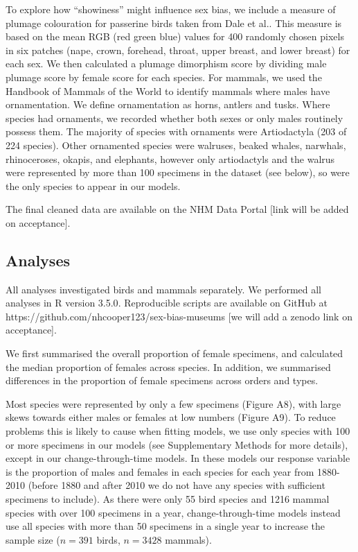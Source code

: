 \documentclass[a4paper, 12pt]{article}
\begin{document}
To explore how ``showiness'' might influence sex bias, we include a measure of plumage colouration for passerine birds taken from Dale et al.\cite{dale2015data,dale2015effects}. 
This measure is based on the mean RGB (red green blue) values for 400 randomly chosen pixels in six patches (nape, crown, forehead, throat, upper breast, and lower breast) for each sex. 
We then calculated a plumage dimorphism score by dividing male plumage score by female score for each species. 
For mammals, we used the Handbook of Mammals of the World to identify mammals where males have ornamentation. We define ornamentation as horns, antlers and tusks. 
Where species had ornaments, we recorded whether both sexes or only males routinely possess them. The majority of species with ornaments were Artiodactyla (203 of 224 species). 
Other ornamented species were walruses, beaked whales, narwhals, rhinoceroses, okapis, and elephants, however only artiodactyls and the walrus were represented by more than 100 specimens in the dataset (see below), so were the only species to appear in our models.

The final cleaned data are available on the NHM Data Portal [link will be added on acceptance]. 

\subsection{Analyses}
All analyses investigated birds and mammals separately. 
We performed all analyses in R version 3.5.0\cite{R}. 
Reproducible scripts are available on GitHub at https://github.com/nhcooper123/sex-bias-museums [we will add a zenodo link on acceptance].

We first summarised the overall proportion of female specimens, and calculated the median proportion of females across species. 
In addition, we summarised differences in the proportion of female specimens across orders and types. 

Most species were represented by only a few specimens (Figure A8), with large skews towards either males or females at low numbers (Figure A9). 
To reduce problems this is likely to cause when fitting models, we use only species with 100 or more specimens in our models (see Supplementary Methods for more details), except in our change-through-time models. 
In these models our response variable is the proportion of males and females in each species for each year from 1880-2010 (before 1880 and after 2010 we do not have any species with sufficient specimens to include). 
As there were only 55 bird species and 1216 mammal species with over 100 specimens in a year, change-through-time models instead use all species with more than 50 specimens in a single year to increase the sample size ($n = 391$ birds, $n = 3428$ mammals).
\end{document}
